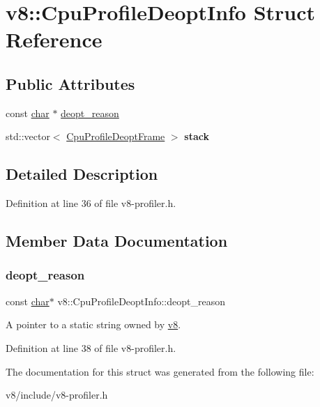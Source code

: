 \hypertarget{structv8_1_1CpuProfileDeoptInfo}{}\section{v8\+:\+:Cpu\+Profile\+Deopt\+Info Struct Reference}
\label{structv8_1_1CpuProfileDeoptInfo}
\subsection*{Public Attributes}
\begin{DoxyCompactItemize}
\item 
const \mbox{\hyperlink{classchar}{char}} $\ast$ \mbox{\hyperlink{structv8_1_1CpuProfileDeoptInfo_a908eb3ba33b47ace8973eeb2fda96ca9}{deopt\+\_\+reason}}
\item 
\mbox{\label{structv8_1_1CpuProfileDeoptInfo_a9446493c0e0a00e3ada02ba8df858d42}} 
std\+::vector$<$ \mbox{\hyperlink{structv8_1_1CpuProfileDeoptFrame}{Cpu\+Profile\+Deopt\+Frame}} $>$ {\bfseries stack}
\end{DoxyCompactItemize}


\subsection{Detailed Description}


Definition at line 36 of file v8-\/profiler.\+h.



\subsection{Member Data Documentation}
\mbox{\label{structv8_1_1CpuProfileDeoptInfo_a908eb3ba33b47ace8973eeb2fda96ca9}} 
\subsubsection{\texorpdfstring{deopt\+\_\+reason}{deopt\_reason}}
{\footnotesize\ttfamily const \mbox{\hyperlink{classchar}{char}}$\ast$ v8\+::\+Cpu\+Profile\+Deopt\+Info\+::deopt\+\_\+reason}

A pointer to a static string owned by \mbox{\hyperlink{namespacev8}{v8}}. 

Definition at line 38 of file v8-\/profiler.\+h.



The documentation for this struct was generated from the following file\+:\begin{DoxyCompactItemize}
\item 
v8/include/v8-\/profiler.\+h\end{DoxyCompactItemize}
